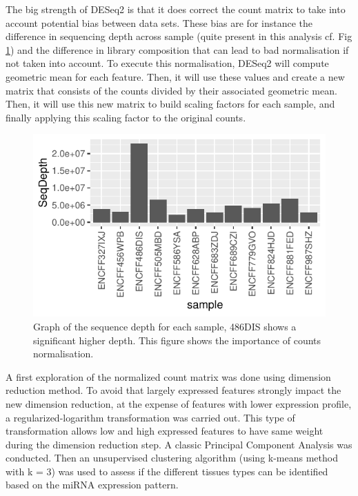 \documentclass[a4paper, 11pt]{article}
\begin{document}
\begin{multicols}{2}
The big strength of DESeq2 is that it does correct the count matrix to take into account potential bias between data sets. These bias are for instance the difference in sequencing depth across sample (quite present in this analysis cf. Fig \ref{fig:depth}) and the difference in library composition that can lead to bad normalisation if not taken into account. To execute this normalisation, DESeq2 will compute geometric mean for each feature. Then, it will use these values and create a new matrix that consists of the counts divided by their associated geometric mean. Then, it will use this new matrix to build scaling factors for each sample, and finally applying this scaling factor to the original counts.
\begin{figure}[H]
	\centering
	\includegraphics[width=1\columnwidth]{Figures/differential_analysis/depth.pdf}
	\caption{\footnotesize{Graph of the sequence depth for each sample, 486DIS shows a significant higher depth. This figure shows the importance of counts normalisation.}}
	\label{fig:depth}
\end{figure}

A first exploration of the normalized count matrix was done using dimension reduction method. To avoid that largely expressed features strongly impact the new dimension reduction, at the expense of features with lower expression profile, a regularized-logarithm transformation was carried out. This type of transformation allows low and high expressed features to have same weight during the dimension reduction step. A classic Principal Component Analysis was conducted. Then an unsupervised clustering algorithm (using k-means method with k = 3) was used to assess if the different tissues types can be identified based on the miRNA expression pattern.


\end{multicols}
\end{document}
